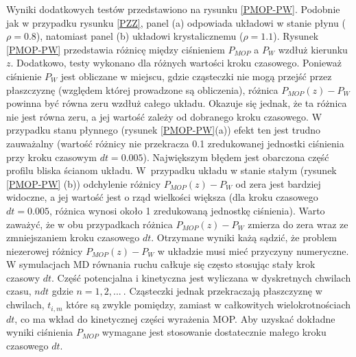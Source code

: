 \documentclass[12pt,a4paper,openright]{report} %
\begin{document}
%
Wyniki dodatkowych testów przedstawiono na rysunku \ref{PMOP-PW}. 
%
%
Podobnie jak w przypadku rysunku \ref{PZZ}, panel (a) odpowiada układowi w stanie płynu ($\rho=0.8$), natomiast panel (b) układowi krystalicznemu ($\rho=1.1$). Rysunek \ref{PMOP-PW} przedstawia różnicę między \linebreak ciśnieniem $P_{MOP}$ a $P_W$ wzdłuż kierunku $z$. Dodatkowo, testy wykonano dla różnych wartości kroku czasowego. Ponieważ ciśnienie $P_W$ jest obliczane w miejscu, gdzie cząsteczki nie mogą przejść przez płaszczyznę (względem której prowadzone są obliczenia), różnica $P_{MOP}(z)-P_W$ powinna być równa zeru wzdłuż całego układu. Okazuje się jednak, że ta różnica nie jest równa zeru, a jej wartość zależy od dobranego kroku czasowego. W przypadku stanu płynnego (rysunek \ref{PMOP-PW}(a)) efekt ten jest trudno zauważalny (wartość różnicy nie przekracza 0.1 zredukowanej jednostki ciśnienia przy kroku czasowym $dt=0.005$). Największym błędem jest obarczona część profilu bliska ścianom układu. W~przypadku układu w stanie stałym (rysunek \ref{PMOP-PW} (b)) odchylenie różnicy $P_{MOP}(z)-P_W$ od zera jest bardziej widoczne, a jej wartość jest o rząd wielkości większa (dla kroku czasowego $dt=0.005$, różnica wynosi około 1 zredukowaną jednostkę ciśnienia). Warto zaważyć, że w obu przypadkach różnica $P_{MOP}(z)-P_W$ zmierza do zera wraz ze zmniejszaniem kroku czasowego $dt$. Otrzymane wyniki każą sądzić, że problem niezerowej różnicy $P_{MOP}(z)-P_W$ w układzie musi mieć przyczyny numeryczne. W symulacjach MD równania ruchu całkuje się często stosując stały krok czasowy $dt$.
Część potencjalna i kinetyczna jest wyliczana w dyskretnych chwilach czasu, $ndt$ gdzie $n=1,2,...~$. Cząsteczki jednak przekraczają płaszczyznę w chwilach, $t_{i,m}$ które są zwykle pomiędzy, zamiast w całkowitych wielokrotnościach $dt$, co ma wkład do kinetycznej części wyrażenia MOP. Aby uzyskać dokładne wyniki ciśnienia $P_{MOP}$ wymagane jest stosowanie dostatecznie małego kroku czasowego $dt$. 
\end{document}
